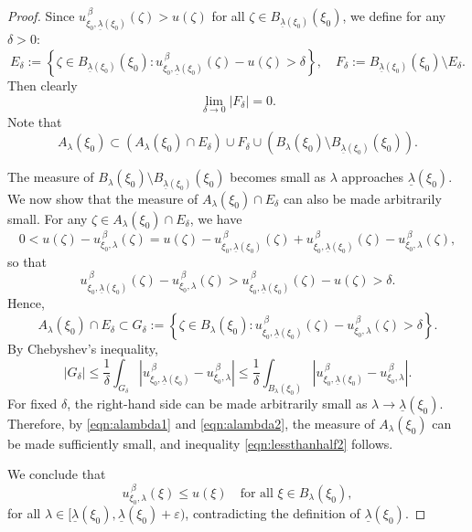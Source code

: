 \documentclass[reqno]{amsart}
\theoremstyle{definition}
\theoremstyle{remark}
\numberwithin{equation}{section}
\begin{document}
\begin{proof}
Since $u_{\xi_0,\underline{\lambda}(\xi_0)}^{\,\beta}(\zeta) > u(\zeta)$ for all $\zeta \in B_{\underline{\lambda}(\xi_0)}(\xi_0)$, we define for any $\delta > 0$:
\[
E_{\delta} := \left\{\zeta \in B_{\underline{\lambda}(\xi_0)}(\xi_0) : u_{\xi_0,\underline{\lambda}(\xi_0)}^{\,\beta}(\zeta) - u(\zeta) > \delta\right\}, \quad
F_{\delta} := B_{\underline{\lambda}(\xi_0)}(\xi_0) \setminus E_{\delta}.
\]
Then clearly
\[
\lim_{\delta \rightarrow 0} |F_{\delta}| = 0.
\]
Note that
\begin{equation}\label{eqn:alambda1}
A_{\lambda}(\xi_0) \subset \left(A_{\lambda}(\xi_0) \cap E_{\delta}\right) \cup F_{\delta} \cup \left(B_{\lambda}(\xi_0) \setminus B_{\underline{\lambda}(\xi_0)}(\xi_0)\right).
\end{equation}

The measure of $B_{\lambda}(\xi_0) \setminus B_{\underline{\lambda}(\xi_0)}(\xi_0)$ becomes small as $\lambda$ approaches $\underline{\lambda}(\xi_0)$. We now show that the measure of $A_{\lambda}(\xi_0) \cap E_{\delta}$ can also be made arbitrarily small. For any $\zeta \in A_{\lambda}(\xi_0) \cap E_{\delta}$, we have
\[
0 < u(\zeta) - u_{\xi_0,\lambda}^{\,\beta}(\zeta) = u(\zeta) - u_{\xi_0,\underline{\lambda}(\xi_0)}^{\,\beta}(\zeta) + u_{\xi_0,\underline{\lambda}(\xi_0)}^{\,\beta}(\zeta) - u_{\xi_0,\lambda}^{\,\beta}(\zeta),
\]
so that
\[
u_{\xi_0,\underline{\lambda}(\xi_0)}^{\,\beta}(\zeta) - u_{\xi_0,\lambda}^{\,\beta}(\zeta) > u_{\xi_0,\underline{\lambda}(\xi_0)}^{\,\beta}(\zeta) - u(\zeta) > \delta.
\]
Hence,
\begin{equation}\label{eqn:alambda2}
A_{\lambda}(\xi_0) \cap E_{\delta} \subset G_{\delta} := \left\{\zeta \in B_{\lambda}(\xi_0) : u_{\xi_0,\underline{\lambda}(\xi_0)}^{\,\beta}(\zeta) - u_{\xi_0,\lambda}^{\,\beta}(\zeta) > \delta\right\}.
\end{equation}
By Chebyshev's inequality,
\[
|G_{\delta}| \leq \frac{1}{\delta} \int_{G_{\delta}} \left|u_{\xi_0,\underline{\lambda}(\xi_0)}^{\,\beta} - u_{\xi_0,\lambda}^{\,\beta}\right| \leq \frac{1}{\delta} \int_{B_{\lambda}(\xi_0)} \left|u_{\xi_0,\underline{\lambda}(\xi_0)}^{\,\beta} - u_{\xi_0,\lambda}^{\,\beta}\right|.
\]
For fixed $\delta$, the right-hand side can be made arbitrarily small as $\lambda \to \underline{\lambda}(\xi_0)$. Therefore, by \eqref{eqn:alambda1} and \eqref{eqn:alambda2}, the measure of $A_{\lambda}(\xi_0)$ can be made sufficiently small, and inequality \eqref{eqn:lessthanhalf2} follows.

We conclude that
\[
u_{\xi_0,\lambda}^{\,\beta}(\xi) \leq u(\xi) \quad \text{for all } \xi \in B_{\lambda}(\xi_0),
\]
for all $\lambda \in [\underline{\lambda}(\xi_0), \underline{\lambda}(\xi_0) + \varepsilon)$, contradicting the definition of $\underline{\lambda}(\xi_0)$.
\end{proof}
\end{document}
